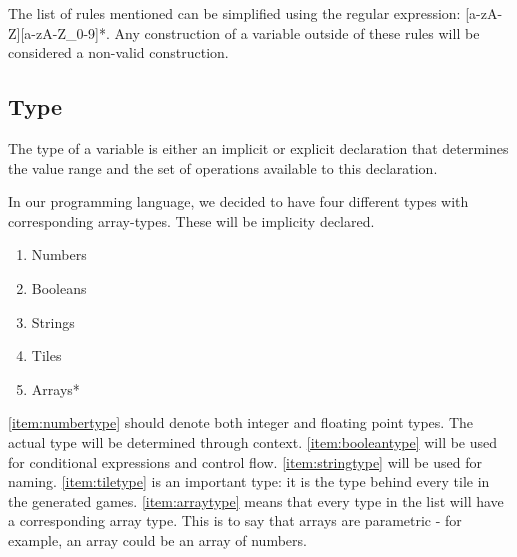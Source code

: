 The list of rules mentioned can be simplified using the regular expression: [a-zA-Z][a-zA-Z\_0-9]*. Any construction of a variable outside of these rules will be considered
a non-valid construction.

\subsection{Type}

The type of a variable is either an implicit or explicit declaration that determines the value range and the set of operations available to this declaration.

In our programming language, we decided to have four different types with corresponding array-types. These will be implicity declared.

\begin{multicols}{3}
\begin{enumerate}
    \item Numbers\label{item:numbertype}
    \item Booleans\label{item:booleantype}
    \item Strings\label{item:stringtype}
    \item Tiles\label{item:tiletype}
    \item Arrays*\label{item:arraytype}
\end{enumerate}
\end{multicols}

\ref{item:numbertype} should denote both integer and floating point types. The actual type will be determined through context. \ref{item:booleantype} will be used for conditional expressions and control flow.
\ref{item:stringtype} will be used for naming.
\ref{item:tiletype} is an important type: it is the type behind every tile in the generated games.
\ref{item:arraytype} means that every type in the list will have a corresponding array type. This is to say that arrays are parametric - for example, an array could be an array of numbers.
